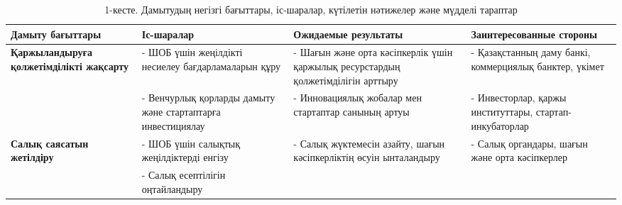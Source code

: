 \begin{table}[H]
    \caption*{1-кесте. Дамытудың негізгі бағыттары, іс-шаралар, күтілетін нәтижелер және мүдделі тараптар}
    \centering
    \begin{tabular}{|p{}|p{}|p{}|p{}|}
        \hline
        \textbf{Дамыту бағыттары} & \textbf{Іс-шаралар} & \textbf{Ожидаемые результаты} & \textbf{Заинтересованные стороны} \\ 
        \hline
        \multirow{2}{=}{\textbf{Қаржыландыруға қолжетімділікті жақсарту}} 
        & \begin{minipage}{0.2\textwidth} - ШОБ үшін жеңілдікті несиелеу бағдарламаларын құру \end{minipage} 
        & \begin{minipage}{0.3\textwidth} - Шағын және орта кәсіпкерлік үшін қаржылық ресурстардың қолжетімділігін арттыру \end{minipage} 
        & \begin{minipage}{0.2\textwidth} - Қазақстанның даму банкі, коммерциялық банктер, үкімет \end{minipage} \\ 
        \cline{2-4}  
        & \begin{minipage}{0.2\textwidth} - Венчурлық қорларды дамыту және стартаптарға инвестициялау \end{minipage} 
        & \begin{minipage}{0.3\textwidth} - Инновациялық жобалар мен стартаптар санының артуы \end{minipage} 
        & \begin{minipage}{0.2\textwidth} - Инвесторлар, қаржы институттары, стартап-инкубаторлар \end{minipage} \\ 
        \hline
        \multirow{2}{=}{\textbf{Салық саясатын жетілдіру}} 
        & \begin{minipage}{0.2\textwidth} - ШОБ үшін салықтық жеңілдіктерді енгізу \end{minipage} 
        & \begin{minipage}{0.3\textwidth} - Салық жүктемесін азайту, шағын кәсіпкерліктің өсуін ынталандыру \end{minipage} 
        & \begin{minipage}{0.2\textwidth} - Салық органдары, шағын және орта кәсіпкерлер \end{minipage} \\ 
        \cline{2-4}  
        & \begin{minipage}{0.2\textwidth} - Салық есептілігін оңтайландыру \end{minipage} 

\end{tabular}
\end{table}

